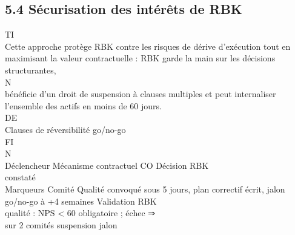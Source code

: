 \subsection{5.4 Sécurisation des intérêts de RBK}
\vspace{0.5em}
\vspace{0.5em}
\vspace{0.5em}
\vspace{0.5em}
TI\\
Cette approche protège RBK contre les risques de dérive d’exécution tout en maximisant la valeur contractuelle : RBK garde la main sur les décisions structurantes,\\
\vspace{0.5em}
\vspace{0.5em}
\vspace{0.5em}
\vspace{0.5em}
N\\
bénéficie d’un droit de suspension à clauses multiples et peut internaliser l’ensemble des actifs en moins de 60 jours.\\
\vspace{0.5em}
\vspace{0.5em}
\vspace{0.5em}
\vspace{0.5em}
DE\\
Clauses de réversibilité go/no-go\\
\vspace{0.5em}
\vspace{0.5em}
\vspace{0.5em}
\vspace{0.5em}
FI\\
N\\
Déclencheur           Mécanisme contractuel          CO                                                                                  Décision RBK\\
constaté\\
Marqueurs             Comité Qualité convoqué sous 5 jours, plan correctif écrit, jalon go/no-go à +4 semaines                           Validation RBK\\
qualité : NPS \textless{} 60                                                                                                                       obligatoire ; échec ⇒\\
sur 2 comités                                                                                                                            suspension jalon\\
